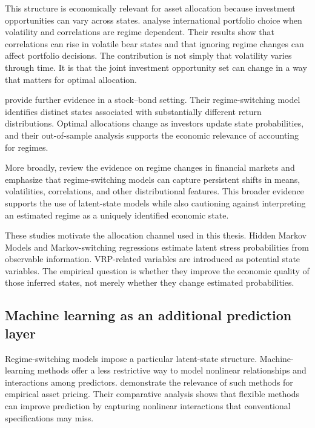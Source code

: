 This structure is economically relevant for asset allocation because investment opportunities can vary across states. \textcite{AngBekaert2002} analyse international portfolio choice when volatility and correlations are regime dependent. Their results show that correlations can rise in volatile bear states and that ignoring regime changes can affect portfolio decisions. The contribution is not simply that volatility varies through time. It is that the joint investment opportunity set can change in a way that matters for optimal allocation.

\textcite{GuidolinTimmermann2007} provide further evidence in a stock--bond setting. Their regime-switching model identifies distinct states associated with substantially different return distributions. Optimal allocations change as investors update state probabilities, and their out-of-sample analysis supports the economic relevance of accounting for regimes.

More broadly, \textcite{AngTimmermann2012} review the evidence on regime changes in financial markets and emphasize that regime-switching models can capture persistent shifts in means, volatilities, correlations, and other distributional features. This broader evidence supports the use of latent-state models while also cautioning against interpreting an estimated regime as a uniquely identified economic state.

These studies motivate the allocation channel used in this thesis. Hidden Markov Models and Markov-switching regressions estimate latent stress probabilities from observable information. VRP-related variables are introduced as potential state variables. The empirical question is whether they improve the economic quality of those inferred states, not merely whether they change estimated probabilities.

\subsection{Machine learning as an additional prediction layer}

Regime-switching models impose a particular latent-state structure. Machine-learning methods offer a less restrictive way to model nonlinear relationships and interactions among predictors. \textcite{GuKellyXiu2020} demonstrate the relevance of such methods for empirical asset pricing. Their comparative analysis shows that flexible methods can improve prediction by capturing nonlinear interactions that conventional specifications may miss.

